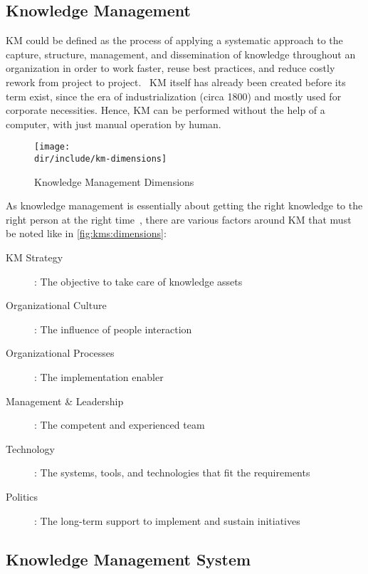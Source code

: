 \subsection{Knowledge Management}

\ac{KM} could be defined as the process of applying a systematic approach to the capture, structure, management, and dissemination of knowledge throughout an organization in order to work faster, reuse best practices, and reduce costly rework from project to project.~\autocite{Dalkir2005KM}
\ac{KM} itself has already been created before its term exist, since the era of industrialization (circa 1800) and mostly used for corporate necessities.
Hence, \ac{KM} can be performed without the help of a computer, with just manual operation by human.

\begin{figure}[htbp]
    \centering
    \texttt{[image: \\dir/include/km-dimensions]}
    \caption{Knowledge Management Dimensions}
    \label{fig:kms:dimensions}
\end{figure}

As knowledge management is essentially about getting the right knowledge to the right person at the right time~\autocite{Frost2010KM}, there are various factors around \ac{KM} that must be noted like in \autoref{fig:kms:dimensions}:

\begin{description}
  \item [KM Strategy]: The objective to take care of knowledge assets
  \item [Organizational Culture]: The influence of people interaction
  \item [Organizational Processes]: The implementation enabler
  \item [Management \& Leadership]: The competent and experienced team
  \item [Technology]: The systems, tools, and technologies that fit the requirements
  \item [Politics]: The long-term support to implement and sustain initiatives
\end{description}

\subsection{Knowledge Management System}

